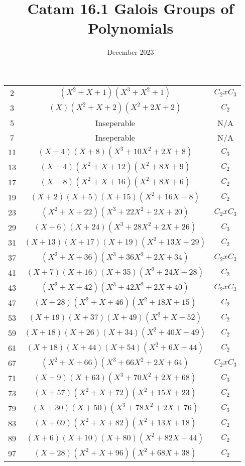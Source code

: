 \documentclass{article}
\begin{document}
\title{Catam 16.1 Galois Groups of Polynomials}
\date{December 2023}

\section{}
\subsection{}

\begin{table}[h!]
	\centering
	\begin{tabular}{ |c|c|c| }
		\hline
		2 & $(X^{2} + X + 1)(X^{3} + X^{2} + 1)$ & $C_2 x C_3$ \\
3 & $(X)(X^{2} + X + 2)(X^{2} + 2X + 2)$ & $C_2$ \\
5 & Inseperable & N/A \\
7 & Inseperable & N/A \\
11 & $(X + 4)(X + 8)(X^{3} + 10X^{2} + 2X + 8)$ & $C_3$ \\
13 & $(X + 4)(X^{2} + X + 12)(X^{2} + 8X + 9)$ & $C_2$ \\
17 & $(X + 8)(X^{2} + X + 16)(X^{2} + 8X + 6)$ & $C_2$ \\
19 & $(X + 2)(X + 5)(X + 15)(X^{2} + 16X + 8)$ & $C_2$ \\
23 & $(X^{2} + X + 22)(X^{3} + 22X^{2} + 2X + 20)$ & $C_2 x C_3$ \\
29 & $(X + 6)(X + 24)(X^{3} + 28X^{2} + 2X + 26)$ & $C_3$ \\
31 & $(X + 13)(X + 17)(X + 19)(X^{2} + 13X + 29)$ & $C_2$ \\
37 & $(X^{2} + X + 36)(X^{3} + 36X^{2} + 2X + 34)$ & $C_2 x C_3$ \\
41 & $(X + 7)(X + 16)(X + 35)(X^{2} + 24X + 28)$ & $C_2$ \\
43 & $(X^{2} + X + 42)(X^{3} + 42X^{2} + 2X + 40)$ & $C_2 x C_3$ \\
47 & $(X + 28)(X^{2} + X + 46)(X^{2} + 18X + 15)$ & $C_2$ \\
53 & $(X + 19)(X + 37)(X + 49)(X^{2} + X + 52)$ & $C_2$ \\
59 & $(X + 18)(X + 26)(X + 34)(X^{2} + 40X + 49)$ & $C_2$ \\
61 & $(X + 18)(X + 44)(X + 54)(X^{2} + 6X + 44)$ & $C_2$ \\
67 & $(X^{2} + X + 66)(X^{3} + 66X^{2} + 2X + 64)$ & $C_2 x C_3$ \\
71 & $(X + 9)(X + 63)(X^{3} + 70X^{2} + 2X + 68)$ & $C_3$ \\
73 & $(X + 57)(X^{2} + X + 72)(X^{2} + 15X + 23)$ & $C_2$ \\
79 & $(X + 30)(X + 50)(X^{3} + 78X^{2} + 2X + 76)$ & $C_3$ \\
83 & $(X + 69)(X^{2} + X + 82)(X^{2} + 13X + 18)$ & $C_2$ \\
89 & $(X + 6)(X + 10)(X + 80)(X^{2} + 82X + 44)$ & $C_2$ \\
97 & $(X + 28)(X^{2} + X + 96)(X^{2} + 68X + 38)$ & $C_2$ \\
	\end{tabular}
\end{table}
\end{document}
